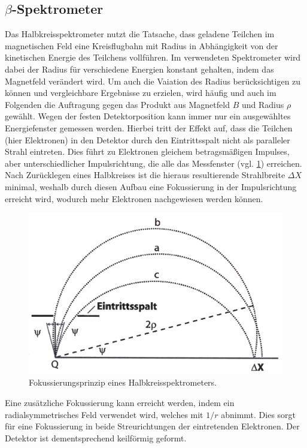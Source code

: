 \documentclass[
	a4paper,
	12pt,
	pagesize,
	ngerman
]{scrartcl}
\begin{document}
	\subsection{$\beta$-Spektrometer}
	Das Halbkreisspektrometer nutzt die Tatsache, dass geladene Teilchen im magnetischen Feld eine Kreisflugbahn mit Radius in Abhängigkeit von der kinetischen Energie des Teilchens vollführen.
	Im verwendeten Spektrometer wird dabei der Radius für verschiedene Energien konstant gehalten, indem das Magnetfeld verändert wird.
	Um auch die Vaiation des Radius berücksichtigen zu können und vergleichbare Ergebnisse zu erzielen, wird häufig und auch im Folgenden die Auftragung gegen das Produkt aus Magnetfeld $B$ und Radius $\rho$ gewählt.
	Wegen der festen Detektorposition kann immer nur ein ausgewähltes Energiefenster gemessen werden.
	Hierbei tritt der Effekt auf, dass die Teilchen (hier Elektronen) in den Detektor durch den Eintrittsspalt nicht als paralleler Strahl eintreten.
	Dies führt zu Elektronen gleichem betragsmäßigen Impulses, aber unterschiedlicher Impulsrichtung, die alle das Messfenster (vgl. \cref{fig_Halbkreisspektrometer}) erreichen.
	Nach Zurücklegen eines Halbkreises ist die hieraus resultierende Strahlbreite $\Delta X$ minimal, weshalb durch diesen Aufbau eine Fokussierung in der Impulsrichtung erreicht wird, wodurch mehr Elektronen nachgewiesen werden können.

	\begin{figure}[H]
			\includegraphics[width= 0.6 \linewidth]{img/spektrometer_schema}
			\caption{
			Fokussierungsprinzip eines Halbkreisspektrometers.
			\cite{Anleitung}
			}
			\label{fig_Halbkreisspektrometer}
	\end{figure}

	Eine zusätzliche Fokussierung kann erreicht werden, indem ein radialsymmetrisches Feld verwendet wird, welches mit $1/r$ abnimmt.
	Dies sorgt für eine Fokussierung in beide Streurichtungen der eintretenden Elektronen.
	Der Detektor ist dementsprechend keilförmig geformt. %
\end{document}

